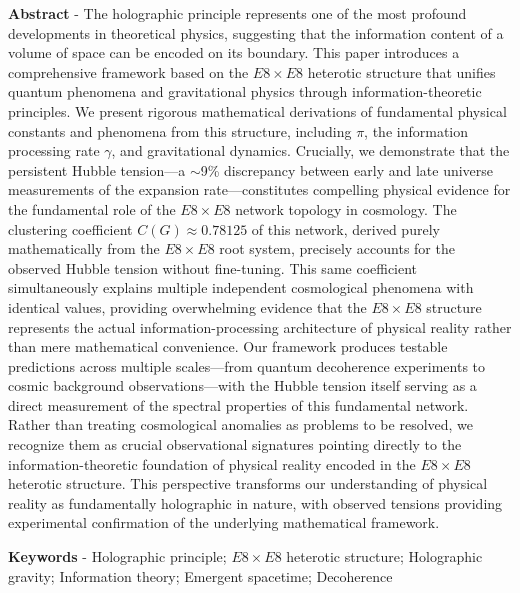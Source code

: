 \documentclass[11pt,english,twoside]{article}
\begin{document}
\vspace{1cm}

\noindent

\noindent
{\small {\bf Abstract} - The holographic principle represents one of the most profound developments in theoretical physics, suggesting that the information content of a volume of space can be encoded on its boundary. This paper introduces a comprehensive framework based on the $E8\times E8$ heterotic structure that unifies quantum phenomena and gravitational physics through information-theoretic principles. We present rigorous mathematical derivations of fundamental physical constants and phenomena from this structure, including $\pi$, the information processing rate $\gamma$, and gravitational dynamics. Crucially, we demonstrate that the persistent Hubble tension—a $\sim$9\% discrepancy between early and late universe measurements of the expansion rate—constitutes compelling physical evidence for the fundamental role of the $E8\times E8$ network topology in cosmology. The clustering coefficient $C(G) \approx 0.78125$ of this network, derived purely mathematically from the $E8\times E8$ root system, precisely accounts for the observed Hubble tension without fine-tuning. This same coefficient simultaneously explains multiple independent cosmological phenomena with identical values, providing overwhelming evidence that the $E8\times E8$ structure represents the actual information-processing architecture of physical reality rather than mere mathematical convenience. Our framework produces testable predictions across multiple scales—from quantum decoherence experiments to cosmic background observations—with the Hubble tension itself serving as a direct measurement of the spectral properties of this fundamental network. Rather than treating cosmological anomalies as problems to be resolved, we recognize them as crucial observational signatures pointing directly to the information-theoretic foundation of physical reality encoded in the $E8\times E8$ heterotic structure. This perspective transforms our understanding of physical reality as fundamentally holographic in nature, with observed tensions providing experimental confirmation of the underlying mathematical framework.}

\vspace{0.75cm}

\noindent
{\small {\bf Keywords} - Holographic principle; $E8\times E8$ heterotic structure; Holographic gravity; Information theory; Emergent spacetime; Decoherence}
\end{document}
